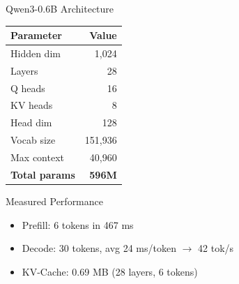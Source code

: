 \documentclass[aspectratio=169, 11pt]{beamer}
\begin{document}
\begin{frame}{Qwen3-0.6B Architecture}

	\begin{center}
		\begin{tabular}{@{}lr@{}}
			\toprule
			\textbf{Parameter}    & \textbf{Value} \\
			\midrule
			Hidden dim            & 1,024          \\
			Layers                & 28             \\
			Q heads               & 16             \\
			KV heads              & 8              \\
			Head dim              & 128            \\
			Vocab size            & 151,936        \\
			Max context           & 40,960         \\
			\midrule
			\textbf{Total params} & \textbf{596M}  \\
			\bottomrule
		\end{tabular}
	\end{center}

	\begin{block}{Measured Performance}
		\begin{itemize}
			\item Prefill: 6 tokens in 467 ms
			\item Decode: 30 tokens, avg 24 ms/token $\rightarrow$ 42 tok/s
			\item KV-Cache: 0.69 MB (28 layers, 6 tokens)
		\end{itemize}
	\end{block}

\end{frame}
\end{document}
